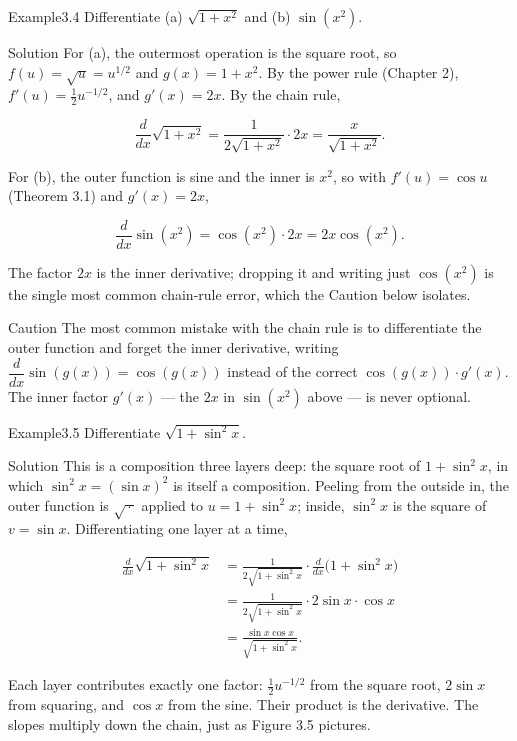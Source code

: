 \documentclass[a4paper,12pt,oneside]{memoir}
\begin{document}
\begin{workedexample}
\begin{envexample}{Example}{3.4}{}
Differentiate (a) \(\sqrt{1 + x^{2}}\) and (b) \(\sin(x^{2})\).
\end{envexample}
\begin{envsolution}{Solution}{}{}
For (a), the outermost operation is the square root, so \(f(u) = \sqrt{u} = u^{1/2}\) and \(g(x) = 1 + x^{2}\). By the power rule (Chapter 2), \(f'(u) = \tfrac12 u^{-1/2}\), and \(g'(x) = 2x\). By the chain rule,

\[ \frac{d}{dx}\sqrt{1 + x^{2}} = \frac{1}{2\sqrt{1 + x^{2}}}\cdot 2x = \frac{x}{\sqrt{1 + x^{2}}}. \]

For (b), the outer function is sine and the inner is \(x^{2}\), so with \(f'(u) = \cos u\) (Theorem 3.1) and \(g'(x) = 2x\),

\[ \frac{d}{dx}\sin(x^{2}) = \cos(x^{2})\cdot 2x = 2x\cos(x^{2}). \]

The factor \(2x\) is the inner derivative; dropping it and writing just \(\cos(x^{2})\) is the single most common chain-rule error, which the Caution below isolates.
\end{envsolution}
\end{workedexample}
\begin{envcaution}{Caution}{}{}
The most common mistake with the chain rule is to differentiate the outer function and forget the inner derivative, writing \(\dfrac{d}{dx}\sin(g(x)) = \cos(g(x))\) instead of the correct \(\cos(g(x))\cdot g'(x)\). The inner factor \(g'(x)\) — the \(2x\) in \(\sin(x^{2})\) above — is never optional.
\end{envcaution}
\begin{workedexample}
\begin{envexample}{Example}{3.5}{}
Differentiate \(\sqrt{1 + \sin^{2} x}\).
\end{envexample}
\begin{envsolution}{Solution}{}{}
This is a composition three layers deep: the square root of \(1 + \sin^{2} x\), in which \(\sin^{2} x = (\sin x)^{2}\) is itself a composition. Peeling from the outside in, the outer function is \(\sqrt{\,\cdot\,}\) applied to \(u = 1 + \sin^{2} x\); inside, \(\sin^{2} x\) is the square of \(v = \sin x\). Differentiating one layer at a time,

\[ \begin{aligned}
          \frac{d}{dx}\sqrt{1 + \sin^{2} x}
            &= \frac{1}{2\sqrt{1 + \sin^{2} x}}\cdot \frac{d}{dx}\bigl(1 + \sin^{2} x\bigr) \\[2pt]
            &= \frac{1}{2\sqrt{1 + \sin^{2} x}}\cdot 2\sin x\cdot \cos x \\[2pt]
            &= \frac{\sin x \cos x}{\sqrt{1 + \sin^{2} x}}.
        \end{aligned} \]

Each layer contributes exactly one factor: \(\tfrac12 u^{-1/2}\) from the square root, \(2\sin x\) from squaring, and \(\cos x\) from the sine. Their product is the derivative. The slopes multiply down the chain, just as Figure 3.5 pictures.
\end{envsolution}
\end{workedexample}
\end{document}
